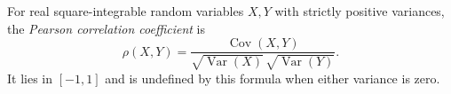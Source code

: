 
For real square-integrable random variables $X,Y$ with strictly positive variances, the \emph{Pearson correlation coefficient} is
\[
\rho(X,Y)=\frac{\operatorname{Cov}(X,Y)}{\sqrt{\operatorname{Var}(X)}\,\sqrt{\operatorname{Var}(Y)}}.
\]
It lies in $[-1,1]$ and is undefined by this formula when either variance is zero.
